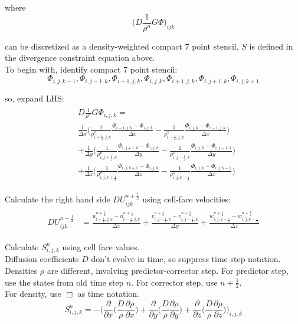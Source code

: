 \documentclass{article}
\numberwithin{equation}{subsection}
\begin{document}
where 
\begin{equation}
\Big(D \frac{1}{\rho^n} G \Phi \Big)_{ijk}
\end{equation}

can be discretized as a density-weighted compact 7 point stencil, $S$ is defined in the divergence constraint equation above. \\
To begin with, identify compact 7 point stencil:
\begin{equation}
\Phi_{i,j,k-1}, \Phi_{i,j-1,k}, \Phi_{i-1,j,k}, \Phi_{i,j,k}, \Phi_{i+1,j,k}, \Phi_{i,j+1,k}, \Phi_{i,j,k+1}
\end{equation}

so, expand LHS:
\begin{align}
\begin{split}
& D\frac{1}{\rho^n}G\Phi_{i,j,k} = \\
& \frac{1}{\Delta x}\Big(\frac{1}{\rho^n_{i+\frac{1}{2},j,k}}\frac{\Phi_{i+1,j,k} - \Phi_{i,j,k}}{\Delta x} - \frac{1}{\rho^n_{i-\frac{1}{2},j,k}}\frac{\Phi_{i,j,k} - \Phi_{i-1,j,k}}{\Delta x}\Big) \\
& + \frac{1}{\Delta y}\Big(\frac{1}{\rho^n_{i,j+\frac{1}{2},k}}\frac{\Phi_{i,j+1,k} - \Phi_{i,j,k}}{\Delta y} - \frac{1}{\rho^n_{i,j-\frac{1}{2},k}}\frac{\Phi_{i,j,k} - \Phi_{i,j-1,k}}{\Delta y}\Big) \\
& + \frac{1}{\Delta z}\Big(\frac{1}{\rho^n_{i,j,k+\frac{1}{2}}}\frac{\Phi_{i,j,k+1} - \Phi_{i,j,k}}{\Delta z} - \frac{1}{\rho^n_{i,j,k-\frac{1}{2}}}\frac{\Phi_{i,j,k} - \Phi_{i,j,k-1}}{\Delta z}\Big)
\end{split}
\end{align}

Calculate the right hand side $DU^{n+\frac{1}{2}}_{ijk}$ using cell-face velocities:
\begin{align}
\begin{split}
DU^{n+\frac{1}{2}}_{ijk} &= \frac{u^{n+\frac{1}{2}}_{i+\frac{1}{2},j,k} - u^{n+\frac{1}{2}}_{i-\frac{1}{2},j,k}}{\Delta x} + \frac{v^{n+\frac{1}{2}}_{i,j+\frac{1}{2},k} - v^{n+\frac{1}{2}}_{i,j-\frac{1}{2},k}}{\Delta y} + \frac{w^{n+\frac{1}{2}}_{i,j,k+\frac{1}{2}} - w^{n+\frac{1}{2}}_{i,j,k-\frac{1}{2}}}{\Delta z}
\end{split}
\end{align}

Calculate $S^n_{i,j,k}$ using cell face values.\\
Diffusion coefficients $D$ don't evolve in time, so suppress time step notation.\\
Densities $\rho$ are different, involving predictor-corrector step. For predictor step, use the states from old time step $n$. For corrector step, use $n+\frac{1}{2}$.\\
For density, use $\Box$ as time notation.
\begin{equation}
S^n_{i,j,k} = - \Bigg( \frac{\partial}{\partial x} \Big( \frac{D}{\rho}\frac{\partial \rho}{\partial x} \Big)
		      + \frac{\partial}{\partial y} \Big( \frac{D}{\rho}\frac{\partial \rho}{\partial y} \Big) 
		      + \frac{\partial}{\partial z} \Big( \frac{D}{\rho}\frac{\partial \rho}{\partial z} \Big) \Bigg)_{i,j,k}
\end{equation}
\end{document}
